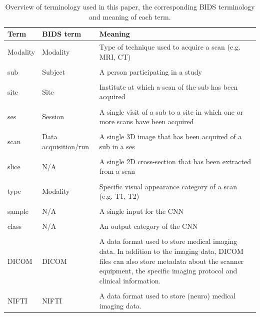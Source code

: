 \begin{table}[htbp]
  \centering

  \caption{Overview of terminology used in this paper, the corresponding \gls{BIDS} terminology and meaning of each term.}
  \label{tab:terminology}
  \begin{tabular}{L{1.5cm}L{3cm}L{6cm}}
  \toprule
  \textbf{Term} & \textbf{\gls{BIDS} term} & \textbf{Meaning}\\
  \midrule
  Modality & Modality & Type of technique used to acquire a \gls{scan} (e.g. \gls{MRI}, \gls{CT})\\
  \\
  \Gls{sub} & Subject & A person participating in a study\\
  \\
  \Gls{site} & Site & Institute at which a \gls{scan} of the \gls{sub} has been acquired\\
  \\
  \Gls{ses} & Session & A single visit of a \gls{sub} to a \gls{site} in which one or more \glspl{scan} have been acquired\\
  \\
  \Gls{scan} & Data acquisition/run & A single 3D image that has been acquired of a \gls{sub} in a \gls{ses}\\
  \\
  \Gls{slice} & N/A & A single 2D cross-section that has been extracted from a \gls{scan}\\
  \\
  \Gls{type} & Modality & Specific visual appearance category of a \gls{scan} (e.g. \gls{T1}, \gls{T2})\\
  \\
  \Gls{sample} & N/A & A single input for the \gls{CNN}\\
  \\
  \Gls{class} & N/A & An output category of the \gls{CNN}\\
  \\
  \gls{DICOM} & DICOM & A data format used to store medical imaging data. In addition to the imaging data, DICOM files can also store metadata about the scanner equipment, the specific imaging protocol and clinical information.\\
  \\
  \gls{NIFTI} & \gls{NIFTI} & A data format used to store (neuro) medical imaging data.\\
  \bottomrule
  \end{tabular}
\end{table}



